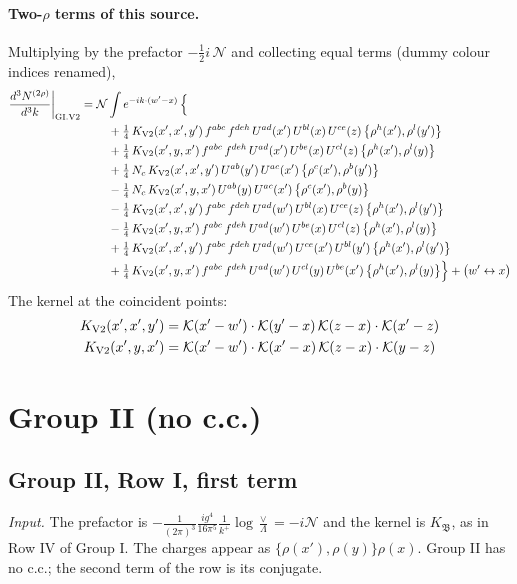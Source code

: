 \documentclass[10pt]{article}
\numberwithin{equation}{section}
\newcommand{\KK}{\mathcal K}
\newcommand{\NN}{\mathcal N}
\begin{document}
\paragraph{Two-$\rho$ terms of this source.} Multiplying by the prefactor $-\tfrac12i\,\NN$ and collecting equal terms (dummy colour indices renamed),
\begin{align}
\frac{d^3N^{(2\rho)}}{d^3k}\bigg|_{\rm GI.V2}={}&\NN\int e^{-ik\cdot(w'-x)}\,\Big\{\notag\\
&\quad +\tfrac14\,K_{\rm V2}(x',x',y')\,f^{abc}\,f^{deh}\,U^{ad}(x')\,U^{bl}(x)\,U^{ce}(z)\,\big\{\rho^{h}(x'),\rho^{l}(y')\big\}\notag\\
&\quad +\tfrac14\,K_{\rm V2}(x',y,x')\,f^{abc}\,f^{deh}\,U^{ad}(x')\,U^{be}(x)\,U^{cl}(z)\,\big\{\rho^{h}(x'),\rho^{l}(y)\big\}\notag\\
&\quad +\tfrac14\,N_{c}\,K_{\rm V2}(x',x',y')\,U^{ab}(y')\,U^{ac}(x')\,\big\{\rho^{c}(x'),\rho^{b}(y')\big\}\notag\\
&\quad -\tfrac14\,N_{c}\,K_{\rm V2}(x',y,x')\,U^{ab}(y)\,U^{ac}(x')\,\big\{\rho^{c}(x'),\rho^{b}(y)\big\}\notag\\
&\quad -\tfrac14\,K_{\rm V2}(x',x',y')\,f^{abc}\,f^{deh}\,U^{ad}(w')\,U^{bl}(x)\,U^{ce}(z)\,\big\{\rho^{h}(x'),\rho^{l}(y')\big\}\notag\\
&\quad -\tfrac14\,K_{\rm V2}(x',y,x')\,f^{abc}\,f^{deh}\,U^{ad}(w')\,U^{be}(x)\,U^{cl}(z)\,\big\{\rho^{h}(x'),\rho^{l}(y)\big\}\notag\\
&\quad +\tfrac14\,K_{\rm V2}(x',x',y')\,f^{abc}\,f^{deh}\,U^{ad}(w')\,U^{ce}(x')\,U^{bl}(y')\,\big\{\rho^{h}(x'),\rho^{l}(y')\big\}\notag\\
&\quad +\tfrac14\,K_{\rm V2}(x',y,x')\,f^{abc}\,f^{deh}\,U^{ad}(w')\,U^{cl}(y)\,U^{be}(x')\,\big\{\rho^{h}(x'),\rho^{l}(y)\big\}\Big\}+\big(w'\leftrightarrow x\big)\label{eq:res-GI.V2}
\end{align}
The kernel at the coincident points:
\begin{align*}
K_{\rm V2}(x',x',y')&=\KK(x'-w')\cdot\KK(y'-x)\,\KK(z-x)\cdot\KK(x'-z)\\K_{\rm V2}(x',y,x')&=\KK(x'-w')\cdot\KK(x'-x)\,\KK(z-x)\cdot\KK(y-z)
\end{align*}
\section{Group II (no c.c.)}\label{sec:G2}
\subsection{Group II, Row I, first term}\label{sec:GII.I1}
\emph{Input.} The prefactor is $-\frac{1}{(2\pi)^3}\frac{ig^4}{16\pi^5}\frac1{k^+}\log\frac\vee\Lambda=-i\NN$ and the kernel is $K_{\mathfrak B}$, as in Row IV of Group I. The charges appear as $\{\rho(x'),\rho(y)\}\rho(x)$. Group II has no c.c.; the second term of the row is its conjugate.
\end{document}
